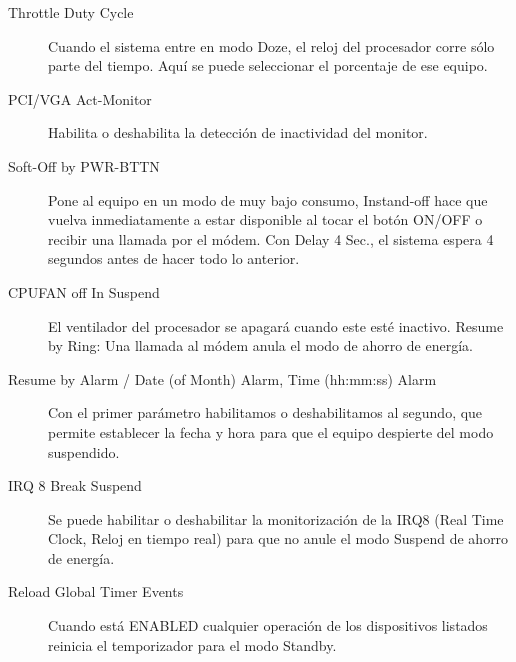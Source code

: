 \documentclass[12pt,oneside,a4paper]{article}
\begin{document}
\begin{description}
				\item[Throttle Duty Cycle] Cuando el sistema entre en modo
					Doze, el reloj del procesador corre sólo parte del tiempo.
					Aquí se puede seleccionar el porcentaje de ese equipo.
				\item[PCI/VGA Act-Monitor] Habilita o deshabilita la detección
					de inactividad del monitor.
				\item[Soft-Off by PWR-BTTN] Pone al equipo en un modo de muy
					bajo consumo, Instand-off hace que vuelva inmediatamente a
					estar disponible al tocar el botón ON/OFF o recibir una
					llamada por el módem. Con Delay 4 Sec., el sistema espera 4
					segundos antes de hacer todo lo anterior.
				\item[CPUFAN off In Suspend] El ventilador del procesador se
					apagará cuando este esté inactivo.  Resume by Ring: Una
					llamada al módem anula el modo de ahorro de energía.
				\item[Resume by Alarm / Date (of Month) Alarm, Time (hh:mm:ss)
					Alarm] Con el primer parámetro habilitamos o deshabilitamos
					al segundo, que permite establecer la fecha y hora para que
					el equipo despierte del modo suspendido.
				\item[IRQ 8 Break Suspend] Se puede habilitar o deshabilitar la
					monitorización de la IRQ8 (Real Time Clock, Reloj en tiempo
					real) para que no anule el modo Suspend de ahorro de
					energía.
				\item[Reload Global Timer Events] Cuando está ENABLED cualquier
					operación de los dispositivos listados reinicia el
					temporizador para el modo Standby.
			\end{description}
			\newpage
\end{document}
